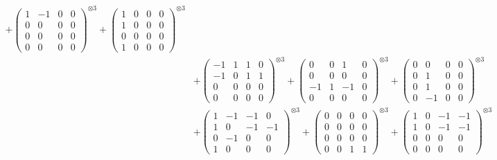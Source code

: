 \documentclass{article}
\begin{document}
{\begin{align}
            + \begin{pmatrix} 1 & -1 & 0 & 0 \\ 0 & 0 & 0 & 0 \\ 0 & 0 & 0 & 0 \\ 0 & 0 & 0 & 0 \end{pmatrix}^{\otimes 3} 
            + \begin{pmatrix} 1 & 0 & 0 & 0 \\ 1 & 0 & 0 & 0 \\ 0 & 0 & 0 & 0 \\ 1 & 0 & 0 & 0 \end{pmatrix}^{\otimes 3} \\
        &+ \label{Rs16-Rc11-Solution-6-c10} \begin{pmatrix} -1 & 1 & 1 & 0 \\ -1 & 0 & 1 & 1 \\ 0 & 0 & 0 & 0 \\ 0 & 0 & 0 & 0 \end{pmatrix}^{\otimes 3} 
            + \begin{pmatrix} 0 & 0 & 1 & 0 \\ 0 & 0 & 0 & 0 \\ -1 & 1 & -1 & 0 \\ 0 & 0 & 0 & 0 \end{pmatrix}^{\otimes 3} 
            + \begin{pmatrix} 0 & 0 & 0 & 0 \\ 0 & 1 & 0 & 0 \\ 0 & 1 & 0 & 0 \\ 0 & -1 & 0 & 0 \end{pmatrix}^{\otimes 3} \\
        &+ \label{Rs16-Rc11-Solution-6-c13} \begin{pmatrix} 1 & -1 & -1 & 0 \\ 1 & 0 & -1 & -1 \\ 0 & -1 & 0 & 0 \\ 1 & 0 & 0 & 0 \end{pmatrix}^{\otimes 3} 
            + \begin{pmatrix} 0 & 0 & 0 & 0 \\ 0 & 0 & 0 & 0 \\ 0 & 0 & 0 & 0 \\ 0 & 0 & 1 & 1 \end{pmatrix}^{\otimes 3} 
            + \begin{pmatrix} 1 & 0 & -1 & -1 \\ 1 & 0 & -1 & -1 \\ 0 & 0 & 0 & 0 \\ 0 & 0 & 0 & 0 \end{pmatrix}^{\otimes 3} \\

\end{align}}
\end{document}
